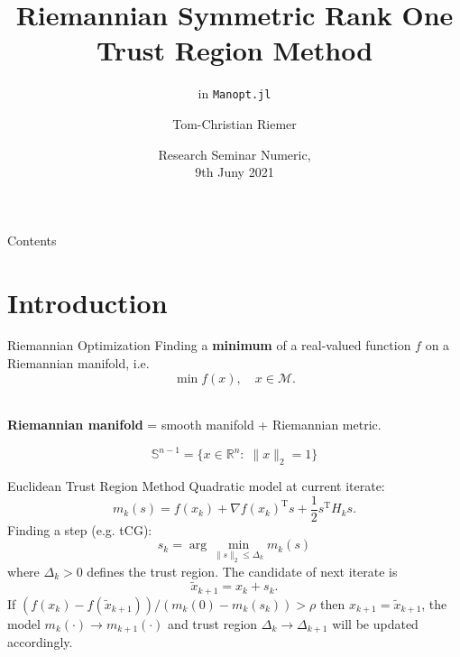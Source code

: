 \documentclass{beamer}
\title{Riemannian Symmetric Rank One Trust Region Method}
\subtitle{in \lstinline!Manopt.jl!}
\author{Tom-Christian Riemer}
\institute{TU Chemnitz}
\date{Research Seminar Numeric,\\ 9th Juny 2021}
\begin{document}
\maketitle

\begin{frame}{Contents}
	\tableofcontents
\end{frame}

\section{Introduction}

\begin{frame}{Riemannian Optimization}
    Finding a \textbf{minimum} of a real-valued function $f$ on a Riemannian manifold, i.e.
    \begin{equation*}
        \min f(x), \quad x \in \mathcal{M}.
    \end{equation*}\\[1.\baselineskip]
    \begin{center}
        \textbf{Riemannian manifold} = smooth manifold + Riemannian metric. \\[1.\baselineskip]
    \end{center}
    \begin{equation*}
        \mathbb{S}^{n-1} = \{ x \in \mathbb{R}^n \colon \; \lVert x \rVert_2 = 1 \}
    \end{equation*}
\end{frame}

\begin{frame}{Euclidean Trust Region Method}
    Quadratic model at current iterate:
	\begin{equation*}
    	m_k(s) = f(x_k) + {\nabla f(x_k)}^{\mathrm{T}} s + \frac{1}{2} s^{\mathrm{T}} H_k s.
    \end{equation*}
	Finding a step (e.g. tCG):
	\begin{equation*}
        s_k = \arg \min_{\lVert s \rVert_2 \leq \Delta_k} m_k(s)
    \end{equation*}
	where $\Delta_k > 0$ defines the trust region. The candidate of next iterate is
	\begin{equation*}
        \tilde{x}_{k+1} = x_k + s_k.
    \end{equation*}
	If $(f(x_k) - f(\tilde{x}_{k+1}))/(m_k(0) - m_k(s_k)) > \rho$ then $x_{k+1} = \tilde{x}_{k+1}$, the model $m_k(\cdot) \rightarrow m_{k+1}(\cdot)$ and trust region $\Delta_k \rightarrow \Delta_{k+1}$ will be updated accordingly. 
\end{frame}
\end{document}
